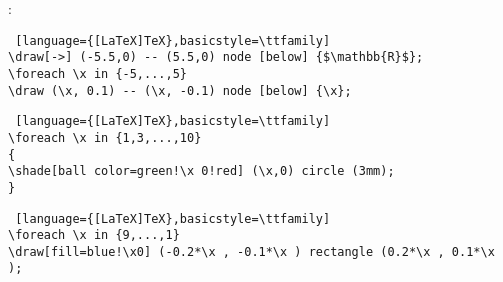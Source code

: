 \begin{note}[Loops]:\\
\begin{lstlisting} [language={[LaTeX]TeX},basicstyle=\ttfamily]
\draw[->] (-5.5,0) -- (5.5,0) node [below] {$\mathbb{R}$};
\foreach \x in {-5,...,5}
\draw (\x, 0.1) -- (\x, -0.1) node [below] {\x};
\end{lstlisting}

\begin{lstlisting} [language={[LaTeX]TeX},basicstyle=\ttfamily]
\foreach \x in {1,3,...,10}
{
\shade[ball color=green!\x 0!red] (\x,0) circle (3mm);
}
\end{lstlisting}
\begin{lstlisting} [language={[LaTeX]TeX},basicstyle=\ttfamily]
\foreach \x in {9,...,1}
\draw[fill=blue!\x0] (-0.2*\x , -0.1*\x ) rectangle (0.2*\x , 0.1*\x );
\end{lstlisting}
\end{note}

